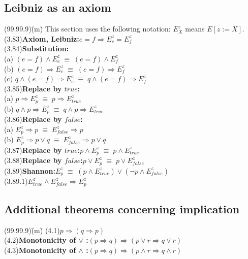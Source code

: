 \documentclass[12pt, fleqn, leqno]{article}
\newcommand{\lgap}{2pt}                             %
\newcommand{\equivs}{\ensuremath{\;\equiv\;}}       %
\newcommand{\impl}{\ensuremath{\Rightarrow}}        %
\begin{document}
\subsection*{Leibniz as an axiom}
\begin{tabbing}
(99.99.9)\;\=(m)\;\=\kill
This section uses the following notation: $E^{z}_{X}$ means $E[z := X]$.\\[\lgap]
(3.83)\>\textbf{Axiom, Leibniz:}\quad $e=f\impl E^{z}_{e} = E^{z}_{f}$\\[\lgap]
(3.84)\>\textbf{Substitution:}\\
      \> (a)\> $(e=f) \land E^{z}_{e} \equivs (e=f)\land E^{z}_{f}$\\[\lgap]
      \> (b)\> $(e=f) \impl E^{z}_{e} \equivs (e=f)\impl E^{z}_{f}$\\[\lgap]
      \> (c)\> $q\land (e=f) \impl E^{z}_{e} \equivs q\land (e=f)\impl E^{z}_{f}$\\[\lgap]
(3.85)\>\textbf{Replace by $true$:}\\
      \> (a)\> $p \impl E^{z}_{p} \equivs p\impl E^{z}_{true}$\\[\lgap]
      \> (b)\> $q\land p \impl E^{z}_{p} \equivs q\land p\impl E^{z}_{true}$\\[\lgap]
(3.86)\>\textbf{Replace by $false$:}\\
      \> (a)\> $E^{z}_{p} \impl p \equivs E^{z}_{false}\impl p$\\[\lgap]
      \> (b)\> $E^{z}_{p} \impl p\lor q \equivs E^{z}_{false}\impl p\lor q$\\[\lgap]
(3.87)\>\textbf{Replace by $true$:}\quad $p\land E^{z}_{p} \equivs p\land E^{z}_{true}$\\[\lgap]
(3.88)\>\textbf{Replace by $false$:}\quad $p\lor E^{z}_{p} \equivs p\lor E^{z}_{false}$\\[\lgap]
(3.89)\>\textbf{Shannon:}\quad $E^{z}_{p}\equivs (p\land E^{z}_{true}) \lor (\neg p\land E^{z}_{false})$\\
(3.89.1)\>$E^{z}_{true}\land E^{z}_{false} \impl E^{z}_{p}$\\
\end{tabbing}

\subsection*{Additional theorems concerning implication}
\begin{tabbing}
(99.99.9)\;\=(m)\;\=\kill
(4.1)\>$p\impl (q\impl p)$\\[\lgap]
(4.2)\>\textbf{Monotonicity of $\lor$ :}\quad $(p\impl q) \impl (p\lor r \impl q\lor r)$\\[\lgap]
(4.3)\>\textbf{Monotonicity of $\land$ :}\quad $(p\impl q) \impl (p\land r \impl q\land r)$\\[\lgap]
\end{tabbing}
\end{document}
